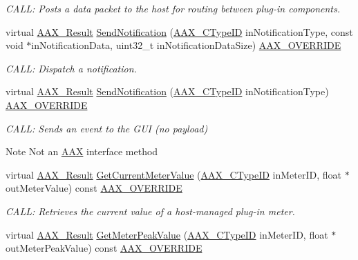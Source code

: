 \begin{DoxyCompactItemize}
\begin{DoxyCompactList}\small\item\em C\+A\+L\+L\+: Posts a data packet to the host for routing between plug-\/in components. \end{DoxyCompactList}\item 
virtual \hyperlink{a00149_a4d8f69a697df7f70c3a8e9b8ee130d2f}{A\+A\+X\+\_\+\+Result} \hyperlink{a00132_a56437f9baf20a312e60af530550634ca}{Send\+Notification} (\hyperlink{a00149_ac678f9c1fbcc26315d209f71a147a175}{A\+A\+X\+\_\+\+C\+Type\+I\+D} in\+Notification\+Type, const void $\ast$in\+Notification\+Data, uint32\+\_\+t in\+Notification\+Data\+Size) \hyperlink{a00149_ac2f24a5172689ae684344abdcce55463}{A\+A\+X\+\_\+\+O\+V\+E\+R\+R\+I\+D\+E}
\begin{DoxyCompactList}\small\item\em C\+A\+L\+L\+: Dispatch a notification. \end{DoxyCompactList}\item 
virtual \hyperlink{a00149_a4d8f69a697df7f70c3a8e9b8ee130d2f}{A\+A\+X\+\_\+\+Result} \hyperlink{a00132_a9118e737491f9362f4e10b129395d76c}{Send\+Notification} (\hyperlink{a00149_ac678f9c1fbcc26315d209f71a147a175}{A\+A\+X\+\_\+\+C\+Type\+I\+D} in\+Notification\+Type) \hyperlink{a00149_ac2f24a5172689ae684344abdcce55463}{A\+A\+X\+\_\+\+O\+V\+E\+R\+R\+I\+D\+E}
\begin{DoxyCompactList}\small\item\em C\+A\+L\+L\+: Sends an event to the G\+U\+I (no payload) \begin{DoxyNote}{Note}
Not an \hyperlink{a00288}{A\+A\+X} interface method 
\end{DoxyNote}
\end{DoxyCompactList}\item 
virtual \hyperlink{a00149_a4d8f69a697df7f70c3a8e9b8ee130d2f}{A\+A\+X\+\_\+\+Result} \hyperlink{a00132_acddee8275367eed5efbc2e2aaa7ccdc8}{Get\+Current\+Meter\+Value} (\hyperlink{a00149_ac678f9c1fbcc26315d209f71a147a175}{A\+A\+X\+\_\+\+C\+Type\+I\+D} in\+Meter\+I\+D, float $\ast$out\+Meter\+Value) const \hyperlink{a00149_ac2f24a5172689ae684344abdcce55463}{A\+A\+X\+\_\+\+O\+V\+E\+R\+R\+I\+D\+E}
\begin{DoxyCompactList}\small\item\em C\+A\+L\+L\+: Retrieves the current value of a host-\/managed plug-\/in meter. \end{DoxyCompactList}\item 
virtual \hyperlink{a00149_a4d8f69a697df7f70c3a8e9b8ee130d2f}{A\+A\+X\+\_\+\+Result} \hyperlink{a00132_aa67ff339e898350954f254aae8affabb}{Get\+Meter\+Peak\+Value} (\hyperlink{a00149_ac678f9c1fbcc26315d209f71a147a175}{A\+A\+X\+\_\+\+C\+Type\+I\+D} in\+Meter\+I\+D, float $\ast$out\+Meter\+Peak\+Value) const \hyperlink{a00149_ac2f24a5172689ae684344abdcce55463}{A\+A\+X\+\_\+\+O\+V\+E\+R\+R\+I\+D\+E}

\end{DoxyCompactItemize}
